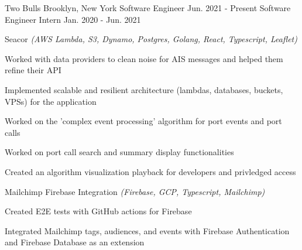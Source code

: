 

\begin{cventries}

  \cventrycustom
      {Two Bulls} %
      {Brooklyn, New York} %
      {Software Engineer} %
      {Jun. 2021 - Present} %
      {Software Engineer Intern} %
      {Jan. 2020 - Jun. 2021} %

\cventrycustombody
      {Seacor \emph{(AWS Lambda, S3, Dynamo, Postgres, Golang, React, Typescript, Leaflet)}}
      {
        \begin{cvitems} %
        \item {Worked with data providers to clean noise for AIS messages and helped them refine their API}
        \item {Implemented scalable and resilient architecture (lambdas, databases, buckets, VPSs) for the application}
        \item {Worked on the 'complex event processing' algorithm for port events and port calls}
        \item {Worked on port call search and summary display functionalities}
        \item {Created an algorithm visualization playback for developers and privledged access}
        \end{cvitems}
      }
      {Mailchimp Firebase Integration \emph{(Firebase, GCP, Typescript, Mailchimp)}}
      {
        \begin{cvitems} %
        \item {Created E2E tests with GitHub actions for Firebase}
        \item {Integrated Mailchimp tags, audiences, and events with Firebase Authentication and Firebase Database as an extension}
        \end{cvitems}
      }
      {}
      {}

\end{cventries}
